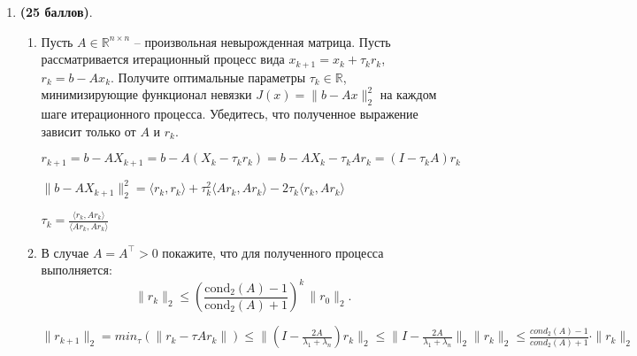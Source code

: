 \documentclass[a4paper, 11pt]{article}
\newcommand{\prob}[1]{\item \textbf{(#1 баллов)}.}
\begin{document}
\begin{enumerate}
\begin{enumerate}
			$PAP^T = \begin{pmatrix}
				4 & 0 & 1 & 0 & 0 \\
				0 & 5 & 2 & 0 & 0 \\
				1 & 2 & 4 & 0 & 1 \\
				0 & 0 & 0 & 1 & 3 \\
				0 & 0 & 1 & 3 & 4 \\
			\end{pmatrix}$
			
			в новом графе ребра $1 \to \\ 3 \to 2 \\ 5 \to 3 \\ 4 \to 5$
			
			
			
			\prob{6} Запишите матрицу $A$ из~\eqref{eq:a} в CSR формате. 
			
			
				$rows = \{0, 4, 6 ,8, 10, 13 \}$
				
				$cols = \{0, 1, 2, 4, 0, 1 0, 2, 3, 4, 0, 3, 4 \}$
				
				$values = \{4, 1, 2, 1, 1, 4, 2,5, 1, 3, 1, 3, 4\}$
			
		\end{enumerate}
		
		\prob{25} 
		\begin{enumerate}
			\item Пусть $A\in\mathbb{R}^{n\times n}$ -- произвольная невырожденная матрица. Пусть рассматривается итерационный процесс вида $x_{k+1} = x_k + \tau_k r_k$, $r_k = b - Ax_k$. 
			Получите оптимальные параметры $\tau_k \in \mathbb{R}$, минимизирующие функционал невязки $J(x) = \|b - Ax\|_2^2$ на каждом шаге итерационного процесса. 
			Убедитесь, что полученное выражение зависит только от $A$ и $r_k$. 
			
				$r_{k + 1} = b - A X_{k + 1} = b - A(X_k - \tau_k r_k) = b - AX_k - \tau_k Ar_k = (I- \tau_k A) r_k$
				
				$\|b - AX_{k + 1}\|_2^2 = \langle r_k, r_k \rangle + \tau^2_k \langle Ar_k, Ar_k \rangle - 2\tau_k \langle r_k, Ar_k \rangle$
				
				$\tau_k = \frac{\langle r_k, Ar_k \rangle}{\langle Ar_k, Ar_k \rangle}$
			
			
			\item В случае $A = A^\top > 0$ покажите, что для полученного процесса выполняется:
			\[
			\|r_{k}\|_2 \leq  \left( \frac{\mathrm{cond}_2(A) - 1}{\mathrm{cond}_2(A) + 1} \right)^k \, \|r_0\|_2.
			\]
			
				$\| r_{k + 1}\|_2 = min_\tau(\| r_k - \tau A r_k\| )\leqslant \|(I - \frac{2A}{\lambda_1 + \lambda_n})r_k\|_2 \leqslant \|I - \frac{2A}{\lambda_1 + \lambda_n}\|_2 \|r_k\|_2	\leqslant \frac{cond_2(A) - 1}{cond_2(A) + 1} \cdot \|r_k\|_2 $
				

\end{enumerate}
\end{enumerate}
\end{document}
